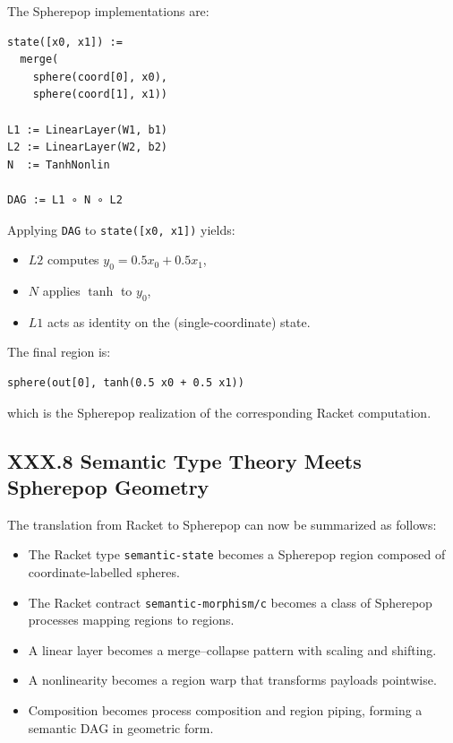\documentclass[11pt,letterpaper]{article}
\begin{document}
The Spherepop implementations are:

\begin{verbatim}
state([x0, x1]) :=
  merge(
    sphere(coord[0], x0),
    sphere(coord[1], x1))

L1 := LinearLayer(W1, b1)
L2 := LinearLayer(W2, b2)
N  := TanhNonlin

DAG := L1 ∘ N ∘ L2
\end{verbatim}

Applying \verb|DAG| to \verb|state([x0, x1])| yields:

\begin{itemize}
  \item $L2$ computes $y_0 = 0.5 x_0 + 0.5 x_1$,
  \item $N$ applies $\tanh$ to $y_0$,
  \item $L1$ acts as identity on the (single-coordinate) state.
\end{itemize}

The final region is:

\begin{verbatim}
sphere(out[0], tanh(0.5 x0 + 0.5 x1))
\end{verbatim}

which is the Spherepop realization of the corresponding Racket computation.

\subsection{XXX.8 Semantic Type Theory Meets Spherepop Geometry}

The translation from Racket to Spherepop can now be summarized as follows:

\begin{itemize}
  \item The Racket type \verb|semantic-state| becomes a Spherepop region composed of coordinate-labelled spheres.
  \item The Racket contract \verb|semantic-morphism/c| becomes a class of Spherepop processes mapping regions to regions.
  \item A linear layer becomes a merge--collapse pattern with scaling and shifting.
  \item A nonlinearity becomes a region warp that transforms payloads pointwise.
  \item Composition becomes process composition and region piping, forming a semantic DAG in geometric form.
\end{itemize}
\end{document}
